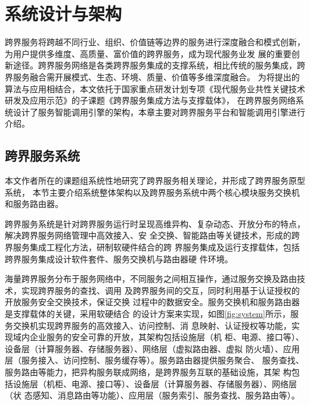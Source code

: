 \chapter{系统设计与架构}
跨界服务将跨越不同行业、组织、价值链等边界的服务进行深度融合和模式创新，为用户提供多维度、高质量、富价值的跨界服务，成为现代服务业发
展的重要创新途径\cite{yin2018crossover}。跨界服务网络是各类跨界服务集成的支撑系统，相比传统的服务集成，跨界服务融合需开展模式、生态、环境、质量、价值等多维深度融合。
为将提出的算法与应用相结合，本文依托于国家重点研发计划专项《现代服务业共性关键技术研发及应用示范》的子课题《跨界服务集成方法与支撑载体》，
在跨界服务网络系统设计了服务智能调用引擎的架构，本章主要对跨界服务平台和智能调用引擎进行介绍。

\section{跨界服务系统}
本文作者所在的课题组系统性地研究了跨界服务相关理论，并形成了跨界服务原型系统，
本节主要介绍系统整体架构以及跨界服务系统中两个核心模块服务交换机和服务路由器\cite{zheng2020service}。

  跨界服务系统是针对跨界服务运行时呈现高维异构、复杂动态、开放分布的特点，解决跨界服务网络管理中高效接入、安
  全交换、智能路由等关键技术，形成的跨界服务集成工程化方法，研制软硬件结合的跨
  界服务集成及运行支撑载体，包括跨界服务集成设计软件套件、服务交换机与路由器硬
  件环境。

  海量跨界服务分布于服务网络中，不同服务之间相互操作，通过服务交换及路由技术，实现跨界服务的查找、调用
  及跨界服务间的交互，同时利用基于认证授权的开放服务安全交换技术，保证交换
  过程中的数据安全。服务交换机和服务路由器是支撑载体的关键，采用软硬结合
  的设计方案来实现，如图\ref{fig:system}所示，服务交换机实现跨界服务的高效接入、访问控制、消
  息映射、认证授权等功能，实现域内企业服务的安全可靠的开放，其架构包括设施层（机
  柜、电源、接口等）、设备层（计算服务器、存储服务器）、网络层（虚拟路由器、虚拟
  防火墙）、应用层（服务接入、访问控制、服务缓存等）\cite{刘皇敏2019跨界服务网络关键技术研究}。服务路由器提供服务聚合、
  服务查找、服务路由等能力，把异构服务联成网络，是跨界服务互联的基础设施，其架
  构包括设施层（机柜、电源、接口等）、设备层（计算服务器、存储服务器）、网络层（状
  态感知、消息路由等功能）、应用层（服务索引、服务查找、服务路由等）。

